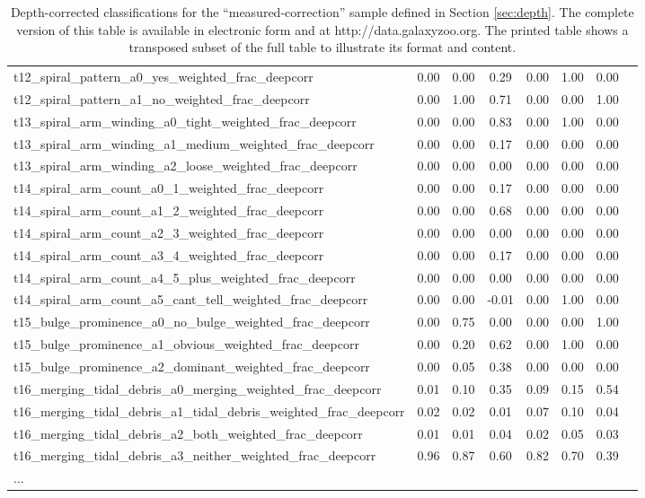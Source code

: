 \begin{table*}
{\begin{tabular}{@{}lccccccc}
t12\_spiral\_pattern\_a0\_yes\_weighted\_frac\_deepcorr & 0.00 & 0.00 & 0.29 & 0.00 & 1.00 & 0.00 & \\
t12\_spiral\_pattern\_a1\_no\_weighted\_frac\_deepcorr & 0.00 & 1.00 & 0.71 & 0.00 & 0.00 & 1.00 & \\
t13\_spiral\_arm\_winding\_a0\_tight\_weighted\_frac\_deepcorr & 0.00 & 0.00 & 0.83 & 0.00 & 1.00 & 0.00 & \\
t13\_spiral\_arm\_winding\_a1\_medium\_weighted\_frac\_deepcorr & 0.00 & 0.00 & 0.17 & 0.00 & 0.00 & 0.00 & \\
t13\_spiral\_arm\_winding\_a2\_loose\_weighted\_frac\_deepcorr & 0.00 & 0.00 & 0.00 & 0.00 & 0.00 & 0.00 & \\
t14\_spiral\_arm\_count\_a0\_1\_weighted\_frac\_deepcorr & 0.00 & 0.00 & 0.17 & 0.00 & 0.00 & 0.00 & \\
t14\_spiral\_arm\_count\_a1\_2\_weighted\_frac\_deepcorr & 0.00 & 0.00 & 0.68 & 0.00 & 0.00 & 0.00 & \\
t14\_spiral\_arm\_count\_a2\_3\_weighted\_frac\_deepcorr & 0.00 & 0.00 & 0.00 & 0.00 & 0.00 & 0.00 & \\
t14\_spiral\_arm\_count\_a3\_4\_weighted\_frac\_deepcorr & 0.00 & 0.00 & 0.17 & 0.00 & 0.00 & 0.00 & \\
t14\_spiral\_arm\_count\_a4\_5\_plus\_weighted\_frac\_deepcorr & 0.00 & 0.00 & 0.00 & 0.00 & 0.00 & 0.00 & \\
t14\_spiral\_arm\_count\_a5\_cant\_tell\_weighted\_frac\_deepcorr & 0.00 & 0.00 & -0.01 & 0.00 & 1.00 & 0.00 & \\
t15\_bulge\_prominence\_a0\_no\_bulge\_weighted\_frac\_deepcorr & 0.00 & 0.75 & 0.00 & 0.00 & 0.00 & 1.00 & \\
t15\_bulge\_prominence\_a1\_obvious\_weighted\_frac\_deepcorr & 0.00 & 0.20 & 0.62 & 0.00 & 1.00 & 0.00 & \\
t15\_bulge\_prominence\_a2\_dominant\_weighted\_frac\_deepcorr & 0.00 & 0.05 & 0.38 & 0.00 & 0.00 & 0.00 & \\
t16\_merging\_tidal\_debris\_a0\_merging\_weighted\_frac\_deepcorr & 0.01 & 0.10 & 0.35 & 0.09 & 0.15 & 0.54 & \\
t16\_merging\_tidal\_debris\_a1\_tidal\_debris\_weighted\_frac\_deepcorr & 0.02 & 0.02 & 0.01 & 0.07 & 0.10 & 0.04 & \\
t16\_merging\_tidal\_debris\_a2\_both\_weighted\_frac\_deepcorr & 0.01 & 0.01 & 0.04 & 0.02 & 0.05 & 0.03 & \\
t16\_merging\_tidal\_debris\_a3\_neither\_weighted\_frac\_deepcorr & 0.96 & 0.87 & 0.60 & 0.82 & 0.70 & 0.39 & \\
$\ldots$    \\
\hline
\end{tabular}}
\caption{Depth-corrected classifications for the ``measured-correction'' sample defined in Section \ref{sec:depth}. The complete version of this table is available in electronic form and at http://data.galaxyzoo.org. The printed table shows a transposed subset of the full table to illustrate its format and content.}
\label{table:data-depthcorr}
\end{table*}
